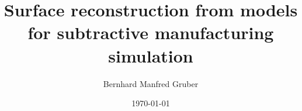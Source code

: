 \documentclass[
a4paper,
final,
]
{scrreprt}
\begin{document}

\title{Surface reconstruction from models for subtractive manufacturing simulation} %
\author{Bernhard Manfred Gruber}
\date{\today}



\setcounter{page}{2} %





\begin{spacing}{0.97}
	\tableofcontents
\end{spacing}
\clearpage

















\listoffigures

\listoftables

\listofalgorithms

\setcounter{biburllcpenalty}{7000}
\setcounter{biburlucpenalty}{8000}
\printbibliography[title=References]
\end{document}
